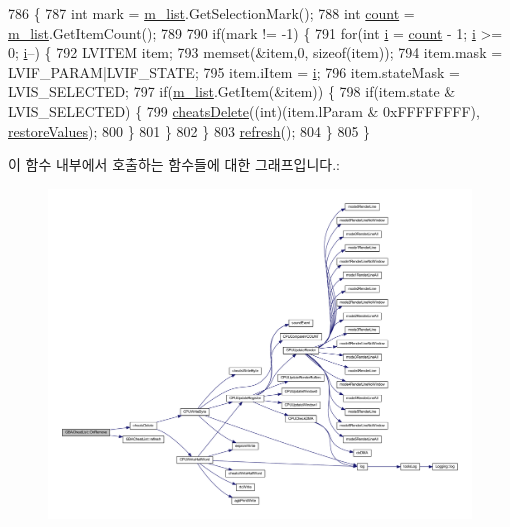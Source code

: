 \begin{DoxyCode}
786 \{
787   \textcolor{keywordtype}{int} mark = \mbox{\hyperlink{class_g_b_a_cheat_list_a00626f69b0783f81eaf76a4483ea76ed}{m\_list}}.GetSelectionMark();
788   \textcolor{keywordtype}{int} \mbox{\hyperlink{expr_8cpp_a16ff2d8e15ade4948398b0aeb80124a8}{count}} = \mbox{\hyperlink{class_g_b_a_cheat_list_a00626f69b0783f81eaf76a4483ea76ed}{m\_list}}.GetItemCount();
789   
790   \textcolor{keywordflow}{if}(mark != -1) \{
791     \textcolor{keywordflow}{for}(\textcolor{keywordtype}{int} \mbox{\hyperlink{expr-lex_8cpp_acb559820d9ca11295b4500f179ef6392}{i}} = \mbox{\hyperlink{expr_8cpp_a16ff2d8e15ade4948398b0aeb80124a8}{count}} - 1; \mbox{\hyperlink{expr-lex_8cpp_acb559820d9ca11295b4500f179ef6392}{i}} >= 0; \mbox{\hyperlink{expr-lex_8cpp_acb559820d9ca11295b4500f179ef6392}{i}}--) \{
792       LVITEM item;
793       memset(&item,0, \textcolor{keyword}{sizeof}(item));
794       item.mask = LVIF\_PARAM|LVIF\_STATE;
795       item.iItem = \mbox{\hyperlink{expr-lex_8cpp_acb559820d9ca11295b4500f179ef6392}{i}};
796       item.stateMask = LVIS\_SELECTED;
797       \textcolor{keywordflow}{if}(\mbox{\hyperlink{class_g_b_a_cheat_list_a00626f69b0783f81eaf76a4483ea76ed}{m\_list}}.GetItem(&item)) \{
798         \textcolor{keywordflow}{if}(item.state & LVIS\_SELECTED) \{
799           \mbox{\hyperlink{_cheats_8cpp_aed7c728054f57c676275ec6e8dda3705}{cheatsDelete}}((\textcolor{keywordtype}{int})(item.lParam & 0xFFFFFFFF), 
      \mbox{\hyperlink{class_g_b_a_cheat_list_a5a6fa66317a2fdab0f9880bd2056c1d0}{restoreValues}});
800         \}
801       \}
802     \}
803     \mbox{\hyperlink{class_g_b_a_cheat_list_a12928bb674926ae02d5a3ceb156a3b53}{refresh}}();
804   \}         
805 \}
\end{DoxyCode}
이 함수 내부에서 호출하는 함수들에 대한 그래프입니다.\+:
\nopagebreak
\begin{figure}[H]
\begin{center}
\leavevmode
\includegraphics[width=350pt]{class_g_b_a_cheat_list_ae8a0358fd127292dda615a647a6f36c9_cgraph}
\end{center}
\end{figure}
\mbox{\label{class_g_b_a_cheat_list_a41727af1d277cd0ac71b80e992b55ec9}} 
